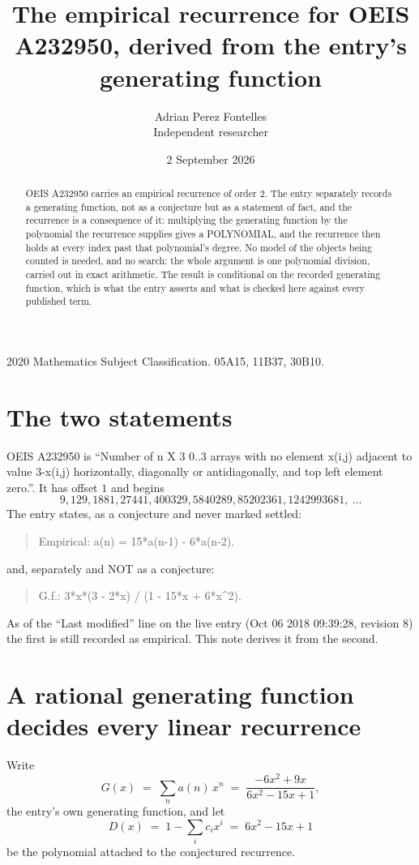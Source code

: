 \documentclass[11pt,a4paper]{article}
\title{The empirical recurrence for OEIS A232950, derived from the entry's generating function}
\author{Adrian Perez Fontelles\\ \small Independent researcher}
\date{2 September 2026}
\theoremstyle{plain}
\theoremstyle{definition}
\begin{document}
\maketitle

\begin{abstract}
OEIS A232950 carries an empirical recurrence of order $2$. The entry separately records a
generating function, not as a conjecture but as a statement of fact, and the recurrence is a
consequence of it: multiplying the generating function by the polynomial the recurrence
supplies gives a POLYNOMIAL, and the recurrence then holds at every index past that
polynomial's degree. No model of the objects being counted is needed, and no search: the
whole argument is one polynomial division, carried out in exact arithmetic. The result is
conditional on the recorded generating function, which is what the entry asserts and what is
checked here against every published term.
\end{abstract}

\noindent\small 2020 Mathematics Subject Classification. 05A15, 11B37, 30B10.\normalsize

\section{The two statements}

OEIS A232950 is ``Number of n X 3 0..3 arrays with no element x(i,j) adjacent to value 3-x(i,j) horizontally, diagonally or antidiagonally, and top left element zero.''. It has offset $1$ and begins
\[
9, 129, 1881, 27441, 400329, 5840289, 85202361, 1242993681,\ \dots
\]
The entry states, as a conjecture and never marked settled:
\begin{quote}
Empirical: a(n) = 15*a(n-1) - 6*a(n-2).
\end{quote}
and, separately and NOT as a conjecture:
\begin{quote}
G.f.: 3*x*(3 - 2*x) / (1 - 15*x + 6*x\^{}2).
\end{quote}
As of the ``Last modified'' line on the live entry (Oct 06 2018 09:39:28, revision 8) the first is still
recorded as empirical. This note derives it from the second.

\section{A rational generating function decides every linear recurrence}

Write
\[
G(x)\;=\;\sum_{n}a(n)\,x^{n}\;=\;\frac{- 6 x^{2} + 9 x}{6 x^{2} - 15 x + 1},
\]
the entry's own generating function, and let
\[
D(x)\;=\;1-\sum_i c_i x^{i}\;=\;6 x^{2} - 15 x + 1
\]
be the polynomial attached to the conjectured recurrence.
\end{document}
